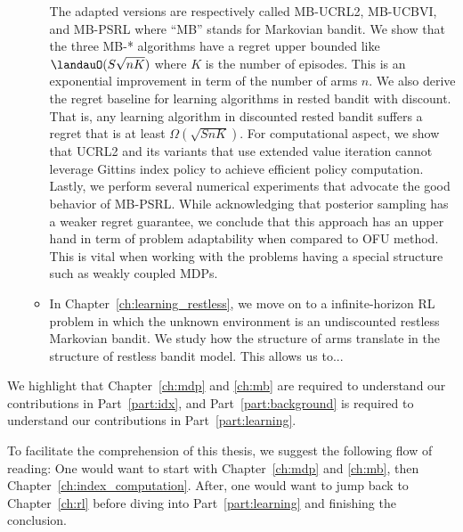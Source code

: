 \begin{itemize}
\begin{itemize}
                The adapted versions are respectively called MB-UCRL2, MB-UCBVI, and MB-PSRL where ``MB'' stands for Markovian bandit.
                We show that the three MB-* algorithms have a regret upper bounded like $\landauO(S\sqrt{nK})$ where $K$ is the number of episodes.
                This is an exponential improvement in term of the number of arms $n$.
                We also derive the regret baseline for learning algorithms in rested bandit with discount.
                That is, any learning algorithm in discounted rested bandit suffers a regret that is at least $\Omega(\sqrt{SnK})$.
                For computational aspect, we show that UCRL2 and its variants that use extended value iteration \cite{jaksch2010near} cannot leverage Gittins index policy to achieve efficient policy computation.
                Lastly, we perform several numerical experiments that advocate the good behavior of MB-PSRL.
                While acknowledging that posterior sampling has a weaker regret guarantee, we conclude that this approach has an upper hand in term of problem adaptability when compared to OFU method.
                This is vital when working with the problems having a special structure such as weakly coupled MDPs.
            \item In Chapter~\ref{ch:learning_restless}, we move on to a infinite-horizon RL problem in which the unknown environment is an undiscounted restless Markovian bandit.
                We study how the structure of arms translate in the structure of restless bandit model.
                This allows us to...
        \end{itemize}
\end{itemize}

We highlight that Chapter~\ref{ch:mdp} and \ref{ch:mb} are required to understand our contributions in Part~\ref{part:idx}, and
Part~\ref{part:background} is required to understand our contributions in Part~\ref{part:learning}.

To facilitate the comprehension of this thesis, we suggest the following flow of reading: One would want to start with Chapter~\ref{ch:mdp} and \ref{ch:mb}, then Chapter~\ref{ch:index_computation}. After, one would want to jump back to Chapter~\ref{ch:rl} before diving into Part~\ref{part:learning} and finishing the conclusion.

%

\endgroup
